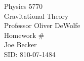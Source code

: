 \begin{titlepage}
\setlength{\topmargin}{1.5in}
\begin{center}
\Huge{Physics 5770} \\
\LARGE{Gravitational Theory} \\
\Large{Professor Oliver DeWolfe} \\[1cm]

\huge{Homework \#\HWnum}\\[0.5cm]

\large{Joe Becker} \\
\large{SID: 810-07-1484} \\
\large{\due} 

\end{center}

\end{titlepage}


